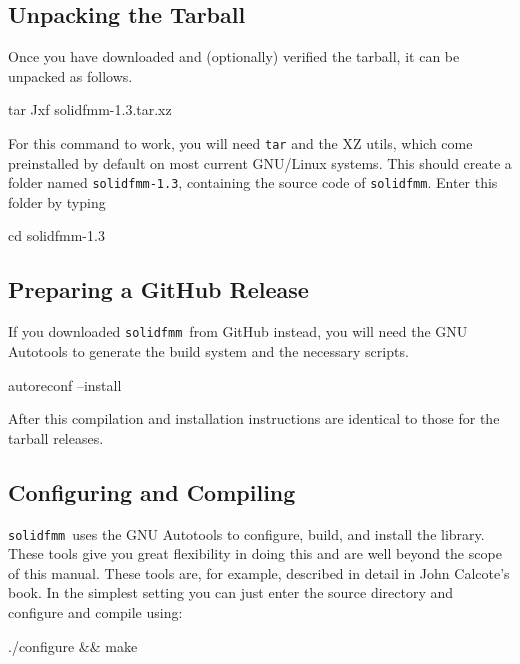 \documentclass{scrbook}
\newcommand{\solidfmm}{\texttt{solidfmm}}
\begin{document}
\subsection{Unpacking the Tarball}
Once you have downloaded and (optionally) verified the tarball, it can be
unpacked as follows.
\begin{commandshell*}
tar Jxf solidfmm-1.3.tar.xz
\end{commandshell*}
For this command to work, you will need \lstinline|tar|\autocite{gnutar} and the
XZ utils\autocite{xzutils}, which come preinstalled by default on most current
GNU/Linux systems. This should create a folder named \lstinline|solidfmm-1.3|,
containing the source code of \solidfmm. Enter this folder by typing
\begin{commandshell*}
cd solidfmm-1.3
\end{commandshell*}

\subsection{Preparing a GitHub Release}
If you downloaded \solidfmm\ from GitHub instead, you will need the GNU
Autotools to generate the build system and the necessary scripts.
\begin{commandshell*}
autoreconf --install
\end{commandshell*}
After this compilation and installation instructions are identical to those
for the tarball releases.

\subsection{Configuring and Compiling}
\solidfmm\ uses the GNU Autotools to configure, build, and install the library.
These tools give you great flexibility in doing this and are well beyond the
scope of this manual. These tools are, for example, described in detail in John
Calcote's book\autocite{calcote2010}. In the simplest setting you can just
enter the source directory and configure and compile using:
\begin{commandshell*}
./configure && make
\end{commandshell*}
\end{document}
